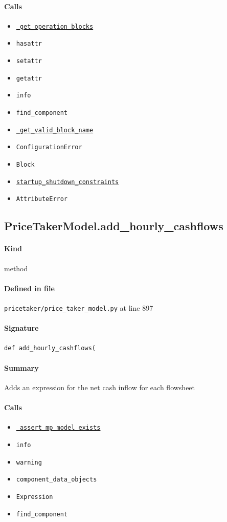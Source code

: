 \documentclass[11pt]{report}
\begin{document}
\paragraph{Calls}
\begin{itemize}[leftmargin=*]
  \item \hyperref[def:pricetaker-price_taker_model.py:PriceTakerModel._get_operation_blocks:L445]{\texttt{\_get\_operation\_blocks}}
  \item \texttt{hasattr}
  \item \texttt{setattr}
  \item \texttt{getattr}
  \item \texttt{info}
  \item \texttt{find\_component}
  \item \hyperref[def:pricetaker-price_taker_model.py:PriceTakerModel._get_valid_block_name:L645]{\texttt{\_get\_valid\_block\_name}}
  \item \texttt{ConfigurationError}
  \item \texttt{Block}
  \item \hyperref[def:pricetaker-unit_commitment.py:startup_shutdown_constraints:L137]{\texttt{startup\_shutdown\_constraints}}
  \item \texttt{AttributeError}
\end{itemize}
\subsection{PriceTakerModel.add\_hourly\_cashflows}
\label{def:pricetaker-price_taker_model.py:PriceTakerModel.add_hourly_cashflows:L897}
\paragraph{Kind} method
\paragraph{Defined in file} \texttt{pricetaker/price\_taker\_model.py} at line 897
\paragraph{Signature} \texttt{def add\_hourly\_cashflows(}
\paragraph{Summary} Adds an expression for the net cash inflow for each flowsheet
\paragraph{Calls}
\begin{itemize}[leftmargin=*]
  \item \hyperref[def:pricetaker-price_taker_model.py:PriceTakerModel._assert_mp_model_exists:L283]{\texttt{\_assert\_mp\_model\_exists}}
  \item \texttt{info}
  \item \texttt{warning}
  \item \texttt{component\_data\_objects}
  \item \texttt{Expression}
  \item \texttt{find\_component}
\end{itemize}
\end{document}
